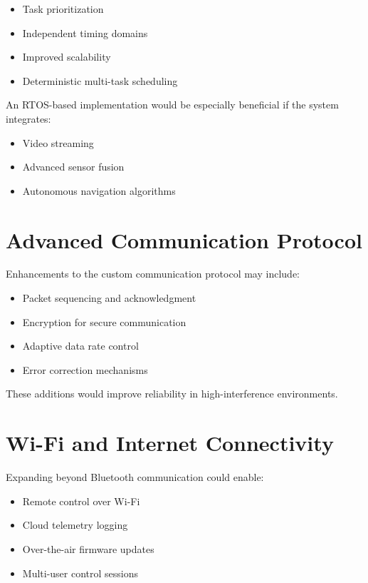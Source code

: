 \begin{itemize}
	\item Task prioritization
	\item Independent timing domains
	\item Improved scalability
	\item Deterministic multi-task scheduling
\end{itemize}

An RTOS-based implementation would be especially beneficial if the system integrates:

\begin{itemize}
	\item Video streaming
	\item Advanced sensor fusion
	\item Autonomous navigation algorithms
\end{itemize}


\section{Advanced Communication Protocol}

Enhancements to the custom communication protocol may include:

\begin{itemize}
	\item Packet sequencing and acknowledgment
	\item Encryption for secure communication
	\item Adaptive data rate control
	\item Error correction mechanisms
\end{itemize}

These additions would improve reliability in high-interference environments.


\section{Wi-Fi and Internet Connectivity}

Expanding beyond Bluetooth communication could enable:

\begin{itemize}
	\item Remote control over Wi-Fi
	\item Cloud telemetry logging
	\item Over-the-air firmware updates
	\item Multi-user control sessions
\end{itemize}

